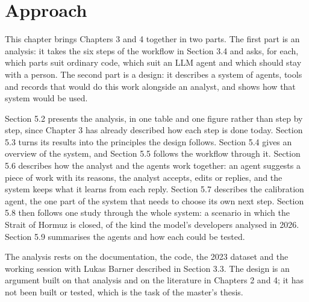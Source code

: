 \section{Approach}

This chapter brings Chapters 3 and 4 together in two parts.
The first part is an analysis: it takes the six steps of the workflow in Section 3.4 and asks, for each, which parts suit ordinary code, which suit an LLM agent and which should stay with a person.
The second part is a design: it describes a system of agents, tools and records that would do this work alongside an analyst, and shows how that system would be used.

Section 5.2 presents the analysis, in one table and one figure rather than step by step, since Chapter 3 has already described how each step is done today.
Section 5.3 turns its results into the principles the design follows.
Section 5.4 gives an overview of the system, and Section 5.5 follows the workflow through it.
Section 5.6 describes how the analyst and the agents work together: an agent suggests a piece of work with its reasons, the analyst accepts, edits or replies, and the system keeps what it learns from each reply.
Section 5.7 describes the calibration agent, the one part of the system that needs to choose its own next step.
Section 5.8 then follows one study through the whole system: a scenario in which the Strait of Hormuz is closed, of the kind the model's developers analysed in 2026.
Section 5.9 summarises the agents and how each could be tested.

The analysis rests on the documentation, the code, the 2023 dataset and the working session with Lukas Barner described in Section 3.3.
The design is an argument built on that analysis and on the literature in Chapters 2 and 4; it has not been built or tested, which is the task of the master's thesis.
